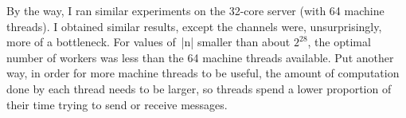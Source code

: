 By the way, I ran similar experiments on the 32-core server (with 64 machine
threads).  I obtained similar results, except the channels were,
unsurprisingly, more of a bottleneck.  For values of~|n| smaller than about
$2^{28}$, the optimal number of workers was less than the 64 machine threads
available.  Put another way, in order for more machine threads to be useful,
the amount of computation done by each thread needs to be larger, so threads
spend a lower proportion of their time trying to send or receive messages. 




